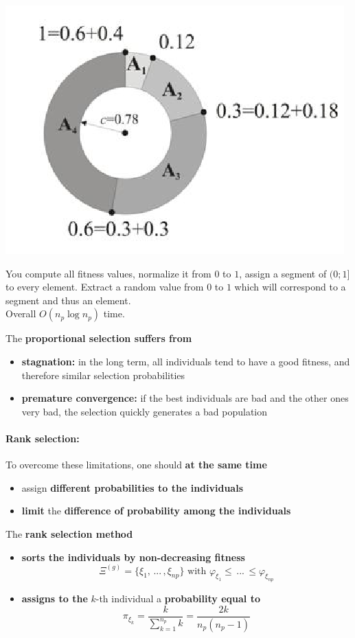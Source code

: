 \begin{center}
	\includegraphics[width=0.5\columnwidth]{img/selectionwheel}
\end{center}

You compute all fitness values, normalize it from $0$ to $1$, assign a segment of $(0; 1]$ to every element. Extract a random value from $0$ to $1$ which will correspond to a segment and thus an element.\\

Overall $O (n_p \log n_p)$ time.\\

\newpage


The \textbf{proportional selection suffers from}
\begin{itemize}
	\item \textbf{stagnation:} in the long term, all individuals tend to have a good fitness, and therefore similar selection probabilities
	\item \textbf{premature convergence:} if the best individuals are bad and the other ones very bad, the selection quickly generates a bad population
\end{itemize}

\nn

\paragraph{Rank selection:} To overcome these limitations, one should \textbf{at the same time}
\begin{itemize}
	\item assign \textbf{different probabilities to the individuals}
	\item \textbf{limit} the \textbf{difference of probability among the individuals}
\end{itemize}

The \textbf{rank selection method}
\begin{itemize}
	\item \textbf{sorts the individuals by non-decreasing fitness}
	$$ \Xi^{(g )} = \{ \xi_1, \, ... \, , \xi_{np}\} \text{ with } \varphi_{\xi_1} \leq \, ... \, \leq \varphi_{\xi_{np}} $$
	
	\item \textbf{assigns to the} $k$-th individual a \textbf{probability equal to}
	$$ \pi_{\xi_k} = \frac{k}{\sum_{k=1}^{n_p} k} = \frac{2k}{n_p (n_p -1)} $$
\end{itemize}


